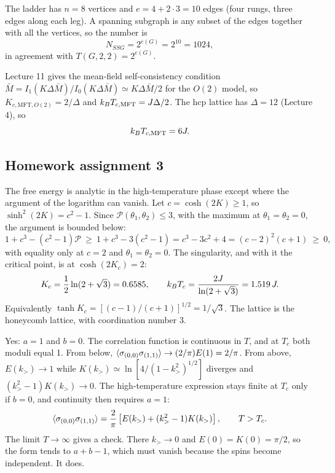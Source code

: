 The ladder has $n = 8$ vertices and $e = 4+2\cdot 3 = 10$ edges (four rungs, three edges along each leg). A spanning
subgraph is any subset of the edges together with all the vertices, so the number is
\begin{equation}
  N_{SSG} = 2^{e(G)} = 2^{10} = 1024 ,
\end{equation}
in agreement with $T(G,2,2) = 2^{e(G)}$.

Lecture 11 gives the mean-field self-consistency condition
$\bar M = I_1(K\Delta\bar M)/I_0(K\Delta\bar M)\simeq K\Delta\bar M/2$ for the $O(2)$ model, so
$K_{c,\text{MFT},O(2)} = 2/\Delta$ and $k_{B} T_{c,\text{MFT}} = J\Delta/2$. The hcp lattice has $\Delta = 12$
(Lecture 4), so
\begin{equation}
  k_{B} T_{c,\text{MFT}} = 6J .
\end{equation}

\subsection{Homework assignment 3}

The free energy is analytic in the high-temperature phase except where the argument of the logarithm can vanish. Let
$c = \cosh(2K)\ge 1$, so $\sinh^2(2K) = c^2-1$. Since $\mathcal P(\theta_1,\theta_2)\le 3$, with the maximum at
$\theta_1 = \theta_2 = 0$, the argument is bounded below:
\begin{equation}
  1+c^3-(c^2-1)\mathcal P\ \ge\ 1+c^3-3(c^2-1) = c^3-3c^2+4 = (c-2)^2(c+1)\ \ge\ 0 ,
\end{equation}
with equality only at $c = 2$ and $\theta_1 = \theta_2 = 0$. The singularity, and with it the critical point, is at
$\cosh(2K_c) = 2$:
\begin{equation}
  K_c = \frac{1}{2}\ln(2+\sqrt3) = 0.6585,\qquad k_{B} T_c = \frac{2J}{\ln(2+\sqrt3)} = 1.519\,J .
\end{equation}
Equivalently $\tanh K_c = [(c-1)/(c+1)]^{1/2} = 1/\sqrt3$. The lattice is the honeycomb lattice, with coordination
number 3.

Yes: $a = 1$ and $b = 0$. The correlation function is continuous in $T$, and at $T_c$ both moduli equal 1. From below,
$\langle \sigma_{(0,0)}\sigma_{(1,1)}\rangle\to(2/\pi)E(1) = 2/\pi$. From above, $E(k_>)\to 1$ while
$K(k_>)\simeq\ln\left[4/(1-k_>^2)^{1/2}\right]$ diverges and $(k_>^2-1)K(k_>)\to 0$. The high-temperature expression
stays finite at $T_c$ only if $b = 0$, and continuity then requires $a = 1$:
\begin{equation}
  \langle \sigma_{(0,0)}\sigma_{(1,1)}\rangle = \frac{2}{\pi}\left[E(k_>)+(k_>^2-1)K(k_>)\right],\qquad T>T_c .
\end{equation}
The limit $T\to\infty$ gives a check. There $k_>\to 0$ and $E(0) = K(0) = \pi/2$, so the form tends to $a+b-1$, which
must vanish because the spins become independent. It does.

